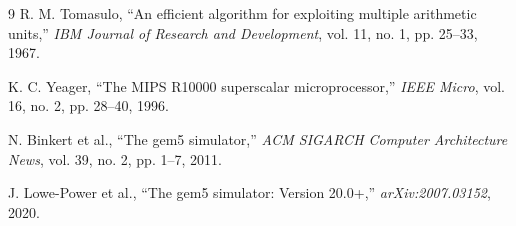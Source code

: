 \documentclass[10pt,twocolumn]{article}
\begin{document}
\begin{thebibliography}{9}
R. M. Tomasulo, ``An efficient algorithm for exploiting multiple arithmetic units,'' \emph{IBM Journal of Research and Development}, vol. 11, no. 1, pp. 25--33, 1967.

K. C. Yeager, ``The MIPS R10000 superscalar microprocessor,'' \emph{IEEE Micro}, vol. 16, no. 2, pp. 28--40, 1996.

N. Binkert et al., ``The gem5 simulator,'' \emph{ACM SIGARCH Computer Architecture News}, vol. 39, no. 2, pp. 1--7, 2011.

J. Lowe-Power et al., ``The gem5 simulator: Version 20.0+,'' \emph{arXiv:2007.03152}, 2020.
\end{thebibliography}
\end{document}
